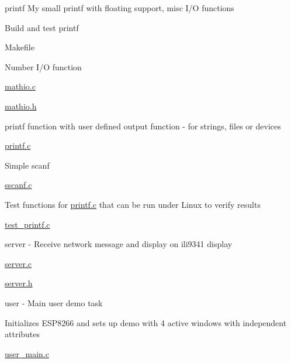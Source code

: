 \begin{DoxyItemize}
\item printf My small printf with floating support, misc I/O functions
\begin{DoxyItemize}
\item Build and test printf
\begin{DoxyItemize}
\item Makefile
\end{DoxyItemize}
\item Number I/O function
\begin{DoxyItemize}
\item \hyperlink{mathio_8c}{mathio.\+c}
\item \hyperlink{mathio_8h}{mathio.\+h}
\end{DoxyItemize}
\item printf function with user defined output function -\/ for strings, files or devices
\begin{DoxyItemize}
\item \hyperlink{printf_8c}{printf.\+c}
\end{DoxyItemize}
\item Simple scanf
\begin{DoxyItemize}
\item \hyperlink{sscanf_8c}{sscanf.\+c}
\end{DoxyItemize}
\item Test functions for \hyperlink{printf_8c}{printf.\+c} that can be run under Linux to verify results
\begin{DoxyItemize}
\item \hyperlink{test__printf_8c}{test\+\_\+printf.\+c}
\end{DoxyItemize}
\end{DoxyItemize}
\item server -\/ Receive network message and display on ili9341 display
\begin{DoxyItemize}
\item \hyperlink{server_8c}{server.\+c}
\item \hyperlink{server_8h}{server.\+h}
\end{DoxyItemize}
\item user -\/ Main user demo task
\begin{DoxyItemize}
\item Initializes E\+S\+P8266 and sets up demo with 4 active windows with independent attributes
\begin{DoxyItemize}
\item \hyperlink{user__main_8c}{user\+\_\+main.\+c}
\end{DoxyItemize}

\end{DoxyItemize}
\end{DoxyItemize}
